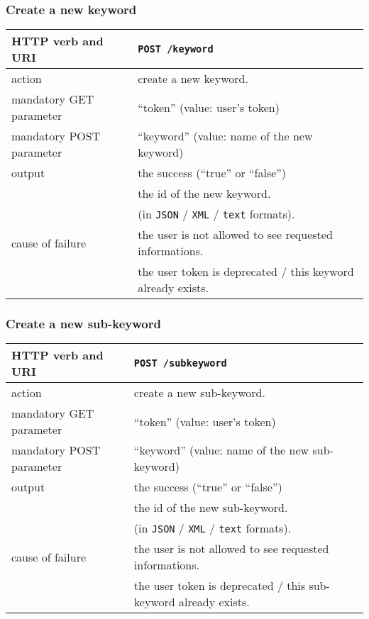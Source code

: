\subsubsection{Create a new keyword}
\begin{tabular}{ | l | l | }
	\hline
	HTTP verb and URI & \texttt{POST /keyword} \\
	\hline
	action & create a new keyword. \\
	\hline
	mandatory GET parameter & ``token'' (value: user's token) \\
	\hline
	mandatory POST parameter & ``keyword'' (value: name of the new keyword) \\
	\hline
	output & the success (``true'' or ``false'')  \\
	\space & the id of the new keyword.  \\
	\space & (in \texttt{JSON} / \texttt{XML} / \texttt{text} formats). \\
	\hline
	cause of failure & the user is not allowed to see requested informations. \\
	\space & the user token is deprecated / this keyword already exists. \\
	\hline
\end{tabular}
\newline

\subsubsection{Create a new sub-keyword}
\begin{tabular}{ | l | l | }
	\hline
	HTTP verb and URI & \texttt{POST /subkeyword} \\
	\hline
	action & create a new sub-keyword. \\
	\hline
	mandatory GET parameter & ``token'' (value: user's token) \\
	\hline
	mandatory POST parameter & ``keyword'' (value: name of the new sub-keyword) \\
	\hline
	output & the success (``true'' or ``false'')  \\
	\space & the id of the new sub-keyword.  \\
	\space & (in \texttt{JSON} / \texttt{XML} / \texttt{text} formats). \\
	\hline
	cause of failure & the user is not allowed to see requested informations. \\
	\space & the user token is deprecated / this sub-keyword already exists. \\
	\hline
\end{tabular}
\newline

